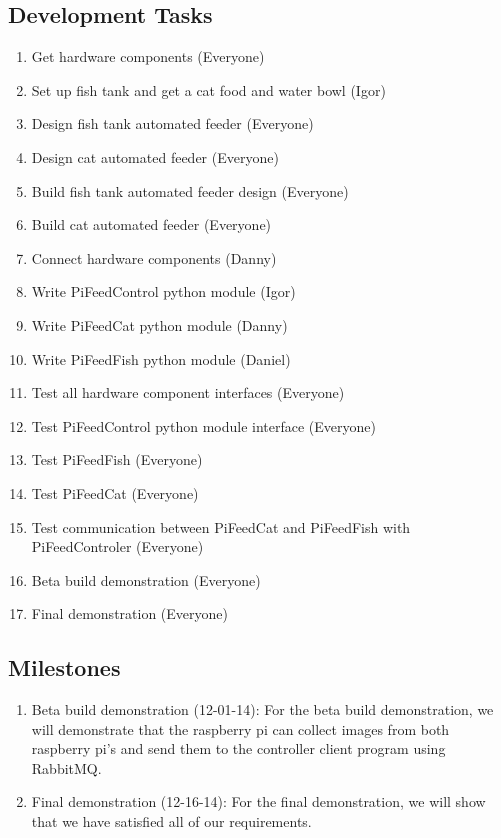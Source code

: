 \subsection{Development Tasks}
\begin{enumerate}
    \item Get hardware components (Everyone)
    \item Set up fish tank and get a cat food and water bowl (Igor)
    \item Design fish tank automated feeder (Everyone)
    \item Design cat automated feeder (Everyone)
    \item Build fish tank automated feeder design (Everyone)
    \item Build cat automated feeder (Everyone)
    \item Connect hardware components (Danny)
    \item Write PiFeedControl python module (Igor)
    \item Write PiFeedCat python module (Danny)
    \item Write PiFeedFish python module (Daniel)
    \item Test all hardware component interfaces (Everyone)
    \item Test PiFeedControl python module interface (Everyone)
    \item Test PiFeedFish (Everyone)
    \item Test PiFeedCat (Everyone)
    \item Test communication between PiFeedCat and PiFeedFish with
          PiFeedControler (Everyone)
    \item Beta build demonstration (Everyone)
    \item Final demonstration (Everyone)

\end{enumerate}

\subsection{Milestones}
\begin{enumerate}
    \item Beta build demonstration (12-01-14): For the beta build demonstration,
    we will demonstrate that the raspberry pi can collect images from both
    raspberry pi's and send them to the controller client program using
    RabbitMQ.
    \item Final demonstration (12-16-14): For the final demonstration, we will
    show that we have satisfied all of our requirements.
\end{enumerate}

